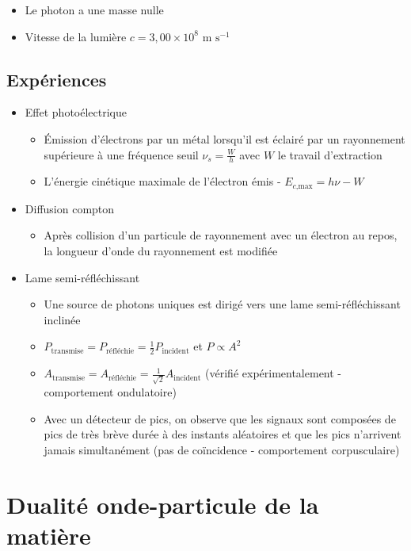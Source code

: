 \documentclass[openany]{book}
\begin{document}
\begin{itemize}
    \item Le photon a une masse nulle
    \item Vitesse de la lumière $c = 3,00 \times 10^8 \text{ m s}^{-1}$
\end{itemize}

\subsection{Expériences}

\begin{itemize}
    \item Effet photoélectrique
    \begin{itemize}
        \item Émission d'électrons par un métal lorsqu'il est éclairé par un rayonnement supérieure à une fréquence seuil $\nu_s = \frac{W}{h}$ avec $W$ le travail d'extraction
        \item L'énergie cinétique maximale de l'électron émis - $E_{c\text{,max}} = h\nu - W$
    \end{itemize}
    \item Diffusion compton
    \begin{itemize}
        \item Après collision d'un particule de rayonnement avec un électron au repos, la longueur d'onde du rayonnement est modifiée
    \end{itemize}
    \item Lame semi-réfléchissant
    \begin{itemize}
        \item Une source de photons uniques est dirigé vers une lame semi-réfléchissant inclinée
        \item $P_{\text{transmise}} = P_{\text{réfléchie}} = \frac{1}{2}P_{\text{incident}}$ et $P \propto A^2$
        \item $A_{\text{transmise}} = A_{\text{réfléchie}} = \frac{1}{\sqrt{2}}A_{\text{incident}}$ (vérifié expérimentalement - comportement ondulatoire)
        \item Avec un détecteur de pics, on observe que les signaux sont composées de pics de très brève durée à des instants aléatoires et que les pics n'arrivent jamais simultanément (pas de coïncidence - comportement corpusculaire)
    \end{itemize}
\end{itemize}

\section{Dualité onde-particule de la matière}
\end{document}
